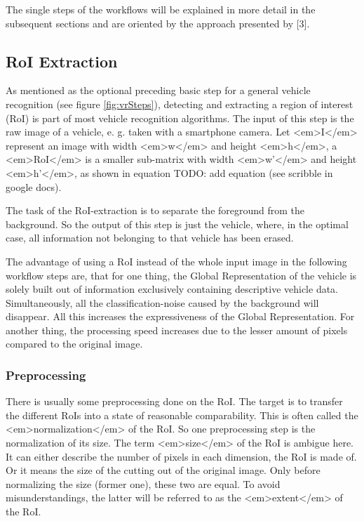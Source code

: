 The single steps of the workflows will be explained in more detail in the subsequent sections and are oriented by the approach presented by [3].

\subsection{RoI Extraction}\label{sec:roiExtraction}
As mentioned as the optional preceding basic step for a general vehicle recognition (see figure \ref{fig:vrSteps}), detecting and extracting a region of interest (RoI) is part of most vehicle recognition algorithms. The input of this step is the raw image of a vehicle, e. g. taken with a smartphone camera.
Let <em>I</em> represent an image with width <em>w</em> and height <em>h</em>, a <em>RoI</em> is a smaller sub-matrix with width <em>w’</em> and height <em>h’</em>, as shown in equation TODO: add equation (see scribble in google docs).

The task of the RoI-extraction is to separate the foreground from the background. So the output of this step is just the vehicle, where, in the optimal case, all information not belonging to that vehicle has been erased.

The advantage of using a RoI instead of the whole input image in the following workflow steps are, that for one thing, the Global Representation of the vehicle is solely built out of information exclusively containing descriptive vehicle data. Simultaneously, all the classification-noise caused by the background will disappear. All this increases the expressiveness of the Global Representation. For another thing, the processing speed increases due to the lesser amount of pixels compared to the original image.

\subsubsection{Preprocessing}
There is usually some preprocessing done on the RoI. The target is to transfer the different RoIs into a state of reasonable comparability. This is often called the <em>normalization</em> of the RoI. So one preprocessing step is the normalization of its size. The term <em>size</em> of the RoI is ambigue here. It can either describe the number of pixels in each dimension, the RoI is made of. Or it means the size of the cutting out of the original image. Only before normalizing the size (former one), these two are equal. To avoid misunderstandings, the latter will be referred to as the <em>extent</em> of the RoI.

